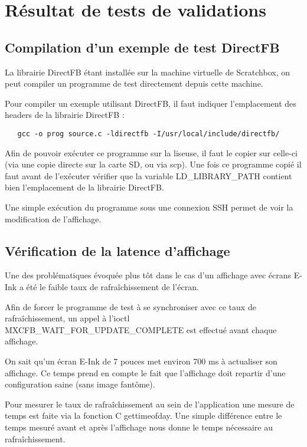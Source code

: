 \chapter{Résultat de tests de validations}


\section{Compilation d'un exemple de test DirectFB}


La librairie DirectFB étant installée sur la machine virtuelle de Scratchbox, on peut compiler un programme de test directement depuis cette machine.

Pour compiler un exemple utilisant DirectFB, il faut indiquer l'emplacement des headers de la librairie DirectFB : 
\begin{lstlisting}
   gcc -o prog source.c -ldirectfb -I/usr/local/include/directfb/
\end{lstlisting}

Afin de pouvoir exécuter ce programme sur la liseuse, il faut le copier sur celle-ci (via une copie directe sur la carte SD, ou via scp).
Une fois ce programme copié il faut avant de l'exécuter vérifier que la variable LD_LIBRARY_PATH contient bien l'emplacement de la librairie DirectFB.

Une simple exécution du programme sous une connexion SSH permet de voir la modification de l'affichage.

\section{Vérification de la latence d'affichage}

Une des problématiques évoquée plus tôt dans le cas d'un affichage avec écrans E-Ink a été le faible taux de rafraîchissement de l'écran.

Afin de forcer le programme de test à se synchroniser avec ce taux de rafraîchissement, un appel à l'ioctl MXCFB_WAIT_FOR_UPDATE_COMPLETE est effectué avant chaque affichage. 

On sait qu'un écran E-Ink de 7 pouces met environ 700 ms à actualiser son affichage. Ce temps prend en compte le fait que l'affichage doit repartir d'une configuration saine (sans image fantôme).

Pour mesurer le taux de rafraîchissement au sein de l'application une mesure de temps est faite via la fonction C gettimeofday. Une simple différence entre le temps mesuré avant et après l'affichage nous donne le temps nécessaire au rafraîchissement.

